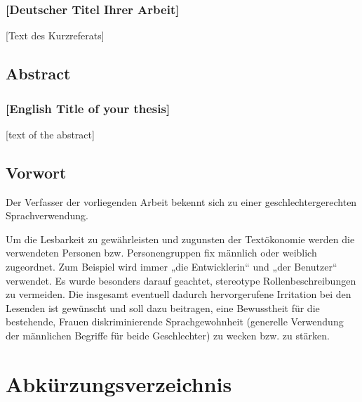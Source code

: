 \documentclass[a4paper,12pt,twoside]{scrreprt}
\begin{document}
\subsection*{[Deutscher Titel Ihrer Arbeit]}

[Text des Kurzreferats]

\newpage
\section*{Abstract}
\subsection*{[English Title of your thesis]}

[text of the abstract]

\newpage
\section*{Vorwort}

Der Verfasser der vorliegenden Arbeit bekennt sich zu einer geschlechtergerechten Sprachverwendung.

Um die Lesbarkeit zu gewährleisten und zugunsten der Textökonomie werden die verwendeten Personen bzw. Personengruppen fix männlich oder weiblich zugeordnet. Zum Beispiel wird immer „die Entwicklerin“ und „der Benutzer“ verwendet. Es wurde besonders darauf geachtet, stereotype Rollenbeschreibungen zu vermeiden. Die insgesamt eventuell dadurch hervorgerufene Irritation bei den Lesenden ist gewünscht und soll dazu beitragen, eine Bewusstheit für die bestehende, Frauen diskriminierende Sprachgewohnheit (generelle Verwendung der männlichen Begriffe für beide Geschlechter) zu wecken bzw. zu stärken. 

\cleardoublepage %
\tableofcontents

\clearpage
{}
{}
\listoffigures

\clearpage
{}
{}
\listoftables

\clearpage
{}
{}
\chapter*{Abkürzungsverzeichnis}
\begin{acronym}
\end{acronym}
\end{document}
